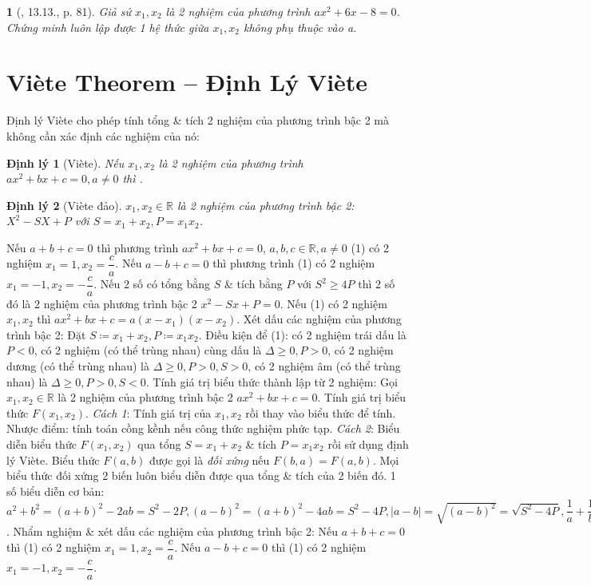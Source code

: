 \documentclass{article}
\newtheorem{baitoan}{}
\newtheorem{dinhly}{Định lý}
\begin{document}
\begin{baitoan}[\cite{TLCT_THCS_Toan_9_dai_so}, 13.13., p. 81]
	Giả sử $x_1,x_2$ là 2 nghiệm của phương trình $ax^2 + 6x - 8 = 0$. Chứng minh luôn lập được 1 hệ thức giữa $x_1,x_2$ không phụ thuộc vào a.
\end{baitoan}


\section{Vi\`ete Theorem -- Định Lý Vi\`ete}
 Định lý Vi\`ete cho phép tính tổng \& tích 2 nghiệm của phương trình bậc 2 mà không cần xác định các nghiệm của nó:

\begin{dinhly}[Vi\`ete]
	Nếu $x_1,x_2$ là 2 nghiệm của phương trình $ax^2 + bx + c = 0,a\ne0$ thì .
\end{dinhly}

\begin{dinhly}[Vi\`ete đảo]
	$x_1,x_2\in\mathbb{R}$ là 2 nghiệm của phương trình bậc 2: $X^2 - SX + P$ với $S = x_1 + x_2,P = x_1x_2$.
\end{dinhly}
\noindent{} Nếu $a + b + c = 0$ thì phương trình $ax^2 + bx + c = 0$, $a,b,c\in\mathbb{R},a\ne0$ (1) có 2 nghiệm $x_1 = 1,x_2 = \dfrac{c}{a}$. Nếu $a - b + c = 0$ thì phương trình (1) có 2 nghiệm $x_1 = -1,x_2 = -\dfrac{c}{a}$.  Nếu 2 số có tổng bằng $S$ \& tích bằng $P$ với $S^2\ge4P$ thì 2 số đó là 2 nghiệm của phương trình bậc 2 $x^2 - Sx + P = 0$.  Nếu (1) có 2 nghiệm $x_1,x_2$ thì $ax^2 + bx + c = a(x - x_1)(x - x_2)$.  {\sf Xét dấu các nghiệm của phương trình bậc 2}: Đặt $S\coloneqq x_1 + x_2,P\coloneqq x_1x_2$. Điều kiện để (1): có 2 nghiệm trái dấu là $P < 0$, có 2 nghiệm (có thể trùng nhau) cùng dấu là $\Delta\ge0,P > 0$, có 2 nghiệm dương (có thể trùng nhau) là $\Delta\ge0,P > 0,S > 0$, có 2 nghiệm âm (có thể trùng nhau) là $\Delta\ge0,P > 0,S < 0$.  {\sf Tính giá trị biểu thức thành lập từ 2 nghiệm}: Gọi $x_1,x_2\in\mathbb{R}$ là 2 nghiệm của phương trình bậc 2 $ax^2 + bx + c = 0$. Tính giá trị biểu thức $F(x_1,x_2)$. \textit{Cách 1}: Tính giá trị của $x_1,x_2$ rồi thay vào biểu thức để tính. Nhược điểm: tính toán cồng kềnh nếu công thức nghiệm phức tạp. \textit{Cách 2}: Biểu diễn biểu thức $F(x_1,x_2)$ qua tổng $S = x_1 + x_2$ \& tích $P = x_1x_2$ rồi sử dụng định lý Vi\`ete.  Biểu thức $F(a,b)$ được gọi là \textit{đối xứng} nếu $F(b,a) = F(a,b)$. Mọi biểu thức đối xứng 2 biến luôn biểu diễn được qua tổng \& tích của 2 biến đó. 1 số biểu diễn cơ bản: $a^2 + b^2 = (a + b)^2 - 2ab = S^2 - 2P,(a - b)^2 = (a + b)^2 - 4ab = S^2 - 4P,|a - b| = \sqrt{(a - b)^2} = \sqrt{S^2 - 4P},\dfrac{1}{a} + \dfrac{1}{b} = \dfrac{a + b}{ab} = \dfrac{S}{P},a^3 + b^3 = (a + b)^3 - 3ab(a + b) = S^3 - 3PS,a^4 + b^4 = (a^2 + b^2)^2 - 2a^2b^2 = (S^2 - 2P)^2 - 2P^2$.  {\sf Nhẩm nghiệm \& xét dấu các nghiệm của phương trình bậc 2}: Nếu $a + b + c = 0$ thì (1) có 2 nghiệm $x_1 = 1,x_2 = \dfrac{c}{a}$. Nếu $a - b + c = 0$ thì (1) có 2 nghiệm $x_1 = -1,x_2 = -\dfrac{c}{a}$.\\
\end{document}

